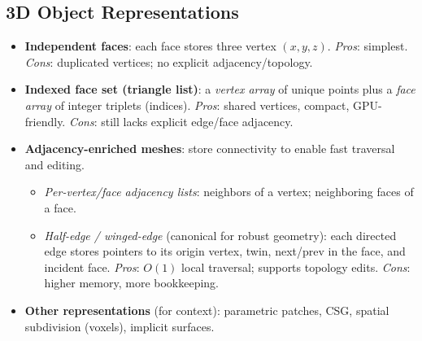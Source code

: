 \documentclass[10pt,twocolumn]{extarticle}
\begin{document}
\subsection*{3D Object Representations}
\begin{itemize}
  \item \textbf{Independent faces}: each face stores three vertex \((x,y,z)\). \emph{Pros}: simplest. \emph{Cons}: duplicated vertices; no explicit adjacency/topology.
  \item \textbf{Indexed face set (triangle list)}: a \emph{vertex array} of unique points plus a \emph{face array} of integer triplets (indices). \emph{Pros}: shared vertices, compact, GPU-friendly. \emph{Cons}: still lacks explicit edge/face adjacency.
  \item \textbf{Adjacency-enriched meshes}: store connectivity to enable fast traversal and editing.
    \begin{itemize}
      \item \emph{Per-vertex/face adjacency lists}: neighbors of a vertex; neighboring faces of a face.
      \item \emph{Half-edge / winged-edge} (canonical for robust geometry): each directed edge stores pointers to its origin vertex, twin, next/prev in the face, and incident face. \emph{Pros}: \(O(1)\) local traversal; supports topology edits. \emph{Cons}: higher memory, more bookkeeping.
    \end{itemize}
  \item \textbf{Other representations} (for context): parametric patches, CSG, spatial subdivision (voxels), implicit surfaces.
\end{itemize}
\end{document}
